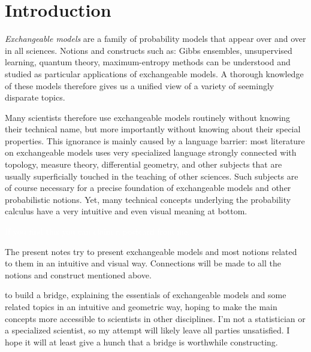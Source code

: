 \documentclass[\ifafour a4paper,12pt,\else a5paper,10pt,\fi%
onecolumn,oneside,article,%
british%
]{memoir}
\theoremstyle{remark}
\theoremstyle{innote}
\renewcommand*{\|}{\nonscript\,\vert\nonscript\;\mathopen{}}
\begin{document}

\section{Introduction}
\label{sec:intro}

\emph{Exchangeable models} are a family of probability models that appear
over and over in all sciences. Notions and constructs such as: Gibbs
ensembles, unsupervised learning, quantum theory, maximum-entropy methods
can be understood and studied as particular applications of exchangeable
models. A thorough knowledge of these models therefore gives us a unified
view of a variety of seemingly disparate topics.

Many scientists therefore use exchangeable models routinely without knowing
their technical name, but more importantly without knowing about their
special properties. This ignorance is mainly caused by a language barrier:
most literature on exchangeable models uses very specialized language
strongly connected with topology, measure theory, differential geometry,
and other subjects that are usually superficially touched in the teaching
of other sciences. Such subjects are of course necessary for a precise
foundation of exchangeable models and other probabilistic notions. Yet,
many technical concepts underlying the probability calculus have a very
intuitive and even visual meaning at bottom.

%
\textcolor{white}{If you find this you can claim a postcard from me.}

The present notes try to present exchangeable models and most notions
related to them in an intuitive and visual way. Connections will be made to
all the notions and construct mentioned above.


to build a bridge, explaining the essentials of
exchangeable models and some related topics in an intuitive and geometric
way, hoping to make the main concepts more accessible to scientists in
other disciplines. I'm not a statistician or a specialized scientist, so my
attempt will likely leave all parties unsatisfied. I hope it will at least
give a hunch that a bridge is worthwhile constructing.
\end{document}
